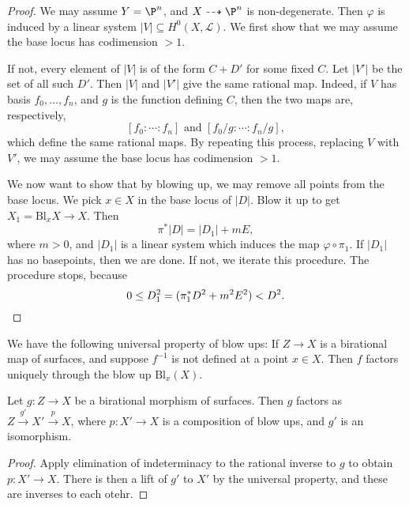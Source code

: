 \documentclass[a4paper]{article}
\newcommand\Bl{\mathrm{Bl}}
\begin{document}
\begin{proof}
  We may assume $Y = \P^n$, and $X \dashrightarrow \P^n$ is non-degenerate. Then $\varphi$ is induced by a linear system $|V| \subseteq H^0(X, \mathcal{L})$. We first show that we may assume the base locus has codimension $> 1$.

  If not, every element of $|V|$ is of the form $C + D'$ for some fixed $C$. Let $|V'|$ be the set of all such $D'$. Then $|V|$ and $|V'|$ give the same rational map. Indeed, if $V$ has basis $f_0, \ldots, f_n$, and $g$ is the function defining $C$, then the two maps are, respectively,
  \[
    [f_0: \cdots : f_n]\text{ and } [f_0/g : \cdots : f_n/g],
  \]
  which define the same rational maps. By repeating this process, replacing $V$ with $V'$, we may assume the base locus has codimension $>1$.

  We now want to show that by blowing up, we may remove all points from the base locus. We pick $x \in X$ in the base locus of $|D|$. Blow it up to get $X_1 = \Bl_x X \to X$. Then
  \[
    \pi^* |D| = |D_1| + mE,
  \]
  where $m > 0$, and $|D_1|$ is a linear system which induces the map $\varphi \circ \pi_1$. If $|D_1|$ has no basepoints, then we are done. If not, we iterate this procedure. The procedure stops, because
  \[
    0 \leq D_1^2 = (\pi_1^* D^2 + m^2 E^2) < D^2.\qedhere
  \]
\end{proof}

\begin{ex}
  We have the following universal property of blow ups: If $Z \to X$ is a birational map of surfaces, and suppose $f^{-1}$ is not defined at a point $x \in X$. Then $f$ factors uniquely through the blow up $\Bl_x(X)$.
\end{ex}

\begin{thm}
  Let $g: Z \to X$ be a birational morphism of surfaces. Then $g$ factors as $Z \overset{g'}{\to} X' \overset{p}{\to} X $, where $p: X' \to X$ is a composition of blow ups, and $g'$ is an isomorphism.
\end{thm}

\begin{proof}
  Apply elimination of indeterminacy to the rational inverse to $g$ to obtain $p: X' \to X$. There is then a lift of $g'$ to $X'$ by the universal property, and these are inverses to each otehr.
%
\end{proof}
\end{document}
